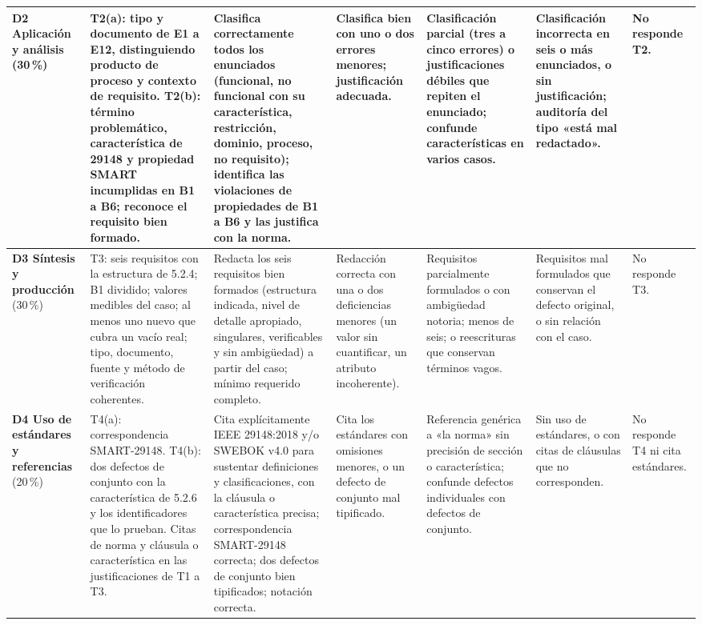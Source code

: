 \documentclass[11pt]{article}
\begin{document}
\begin{landscape}
{\begin{longtable}{|L{2.6cm}|L{4.3cm}|L{3.5cm}|L{3.2cm}|L{3.2cm}|L{3.0cm}|L{1.8cm}|}
			\hline

			\textbf{D2 Aplicación y análisis} (30\,\%) & T2(a): tipo y documento de E1 a E12, distinguiendo producto de proceso y contexto de requisito. T2(b): término problemático, característica de 29148 y propiedad SMART incumplidas en B1 a B6; reconoce el requisito bien formado. & Clasifica correctamente todos los enunciados (funcional, no funcional con su característica, restricción, dominio, proceso, no requisito); identifica las violaciones de propiedades de B1 a B6 y las justifica con la norma. & Clasifica bien con uno o dos errores menores; justificación adecuada. & Clasificación parcial (tres a cinco errores) o justificaciones débiles que repiten el enunciado; confunde características en varios casos. & Clasificación incorrecta en seis o más enunciados, o sin justificación; auditoría del tipo «está mal redactado». & No responde T2.\\

			\hline

			\textbf{D3 Síntesis y producción} (30\,\%) & T3: seis requisitos con la estructura de 5.2.4; B1 dividido; valores medibles del caso; al menos uno nuevo que cubra un vacío real; tipo, documento, fuente y método de verificación coherentes. & Redacta los seis requisitos bien formados (estructura indicada, nivel de detalle apropiado, singulares, verificables y sin ambigüedad) a partir del caso; mínimo requerido completo. & Redacción correcta con una o dos deficiencias menores (un valor sin cuantificar, un atributo incoherente). & Requisitos parcialmente formulados o con ambigüedad notoria; menos de seis; o reescrituras que conservan términos vagos. & Requisitos mal formulados que conservan el defecto original, o sin relación con el caso. & No responde T3.\\

			\hline

			\textbf{D4 Uso de estándares y referencias} (20\,\%) & T4(a): correspondencia SMART-29148. T4(b): dos defectos de conjunto con la característica de 5.2.6 y los identificadores que lo prueban. Citas de norma y cláusula o característica en las justificaciones de T1 a T3. & Cita explícitamente IEEE 29148:2018 y/o SWEBOK v4.0 para sustentar definiciones y clasificaciones, con la cláusula o característica precisa; correspondencia SMART-29148 correcta; dos defectos de conjunto bien tipificados; notación correcta. & Cita los estándares con omisiones menores, o un defecto de conjunto mal tipificado. & Referencia genérica a «la norma» sin precisión de sección o característica; confunde defectos individuales con defectos de conjunto. & Sin uso de estándares, o con citas de cláusulas que no corresponden. & No responde T4 ni cita estándares.\\


\end{longtable}}
\end{landscape}
\end{document}
